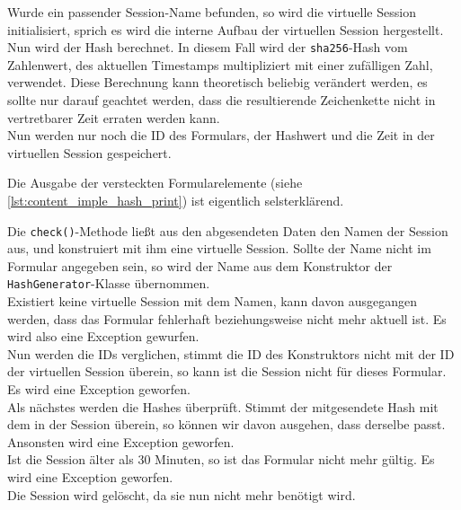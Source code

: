 Wurde ein passender Session-Name befunden, so wird die virtuelle Session initialisiert, sprich es wird die interne Aufbau der virtuellen Session hergestellt.\\
Nun wird der Hash berechnet. In diesem Fall wird der \texttt{sha256}-Hash vom Zahlenwert, des aktuellen Timestamps multipliziert mit einer zufälligen Zahl, verwendet. Diese Berechnung kann theoretisch beliebig verändert werden, es sollte nur darauf geachtet werden, dass die resultierende Zeichenkette nicht in vertretbarer Zeit erraten werden kann.\\
Nun werden nur noch die ID des Formulars, der Hashwert und die Zeit in der virtuellen Session gespeichert.

Die Ausgabe der versteckten Formularelemente (siehe \autoref{lst:content_imple_hash_print}) ist eigentlich selsterklärend.

Die \texttt{check()}-Methode ließt aus den abgesendeten Daten den Namen der Session aus, und konstruiert mit ihm eine virtuelle Session. Sollte der Name nicht im Formular angegeben sein, so wird der Name aus dem Konstruktor der \texttt{HashGenerator}-Klasse übernommen.\\
Existiert keine virtuelle Session mit dem Namen, kann davon ausgegangen werden, dass das Formular fehlerhaft beziehungsweise nicht mehr aktuell ist. Es wird also eine Exception gewurfen.\\
Nun werden die IDs verglichen, stimmt die ID des Konstruktors nicht mit der ID der virtuellen Session überein, so kann ist die Session nicht für dieses Formular. Es wird eine Exception geworfen.\\
Als nächstes werden die Hashes überprüft. Stimmt der mitgesendete Hash mit dem in der Session überein, so können wir davon ausgehen, dass derselbe passt. Ansonsten wird eine Exception geworfen.\\
Ist die Session älter als 30 Minuten, so ist das Formular nicht mehr gültig. Es wird eine Exception geworfen.\\
Die Session wird gelöscht, da sie nun nicht mehr benötigt wird.

